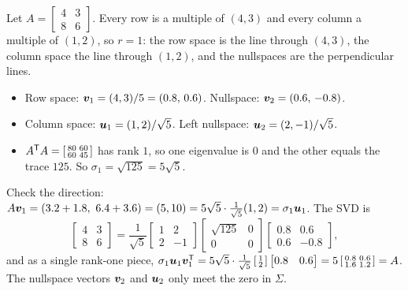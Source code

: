 \begin{example}\label{ex:u33-rank1}
Let $A=\begin{bmatrix}4&3\\8&6\end{bmatrix}$. Every row is a multiple of $(4,3)$ and every column a
multiple of $(1,2)$, so $r=1$: the row space is the line through $(4,3)$, the column space the line
through $(1,2)$, and the nullspaces are the perpendicular lines.
\begin{itemize}
  \item Row space: $\boldsymbol{v}_1=(4,3)/5=(0.8,\,0.6)$. Nullspace: $\boldsymbol{v}_2=(0.6,\,-0.8)$.
  \item Column space: $\boldsymbol{u}_1=(1,2)/\sqrt5$. Left nullspace: $\boldsymbol{u}_2=(2,-1)/\sqrt5$.
  \item $A^{\mathsf{T}} A=\left[\begin{smallmatrix}80&60\\60&45\end{smallmatrix}\right]$ has rank $1$, so one eigenvalue
        is $0$ and the other equals the trace $125$. So $\sigma_1=\sqrt{125}=5\sqrt5$.
\end{itemize}
Check the direction: $A\vb{v}_1=(3.2+1.8,\ 6.4+3.6)=(5,10)=5\sqrt5\cdot\tfrac{1}{\sqrt5}(1,2)=\sigma_1\vb{u}_1$. The SVD is
\[
  \begin{bmatrix}4&3\\8&6\end{bmatrix}
  =\frac{1}{\sqrt5}\begin{bmatrix}1&2\\2&-1\end{bmatrix}
   \begin{bmatrix}\sqrt{125}&0\\0&0\end{bmatrix}
   \begin{bmatrix}0.8&0.6\\0.6&-0.8\end{bmatrix},
\]
and as a single rank-one piece, $\sigma_1\boldsymbol{u}_1\boldsymbol{v}_1^{\mathsf{T}}=5\sqrt5\cdot\frac{1}{\sqrt5}\left[\begin{smallmatrix}1\\2\end{smallmatrix}\right]
\begin{bmatrix}0.8&0.6\end{bmatrix}=5\left[\begin{smallmatrix}0.8&0.6\\1.6&1.2\end{smallmatrix}\right]=A$. The
nullspace vectors $\boldsymbol{v}_2$ and $\boldsymbol{u}_2$ only meet the zero in $\Sigma$.
\end{example}

